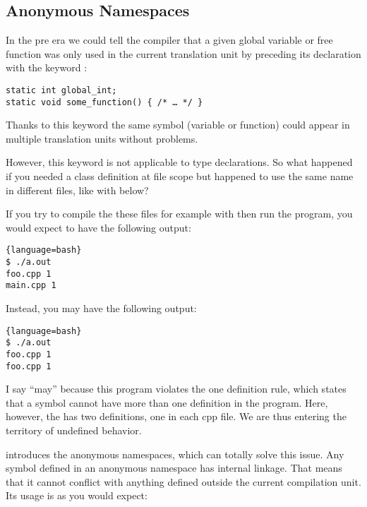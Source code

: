 \subsection{Anonymous Namespaces}

In the pre  era we could tell the compiler that a given global
variable or free function was only used in the current translation
unit by preceding its declaration with the keyword :

\begin{lstlisting}
static int global_int;
static void some_function() { /* … */ }
\end{lstlisting}

Thanks to this keyword the same symbol (variable or function) could
appear in multiple translation units without problems.

However, this keyword is not applicable to type declarations. So what
happened if you needed a class definition at file scope but happened
to use the same name in different files, like with 
below?




If you try to compile the these files for example with  then run the program, you would expect to have the
following output:

\begin{lstlisting}{language=bash}
$ ./a.out
foo.cpp 1
main.cpp 1
\end{lstlisting}

Instead, you may have the following output:

\begin{lstlisting}{language=bash}
$ ./a.out
foo.cpp 1
foo.cpp 1
\end{lstlisting}

I say ``may'' because this program violates the one definition rule,
which states that a symbol cannot have more than one definition in the
program. Here, however, the  has two definitions, one
in each cpp file. We are thus entering the territory of undefined
behavior.

\bigskip

 introduces the anonymous namespaces, which can totally solve
this issue. Any symbol defined in an anonymous namespace has internal
linkage. That means that it cannot conflict with anything defined
outside the current compilation unit. Its usage is as you would
expect:

